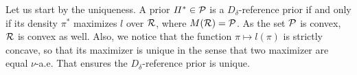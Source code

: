 Let us start by the uniqueness.
%
%
%
A prior $\varPi^\ast\in\mathcal{P}$ is a $D_\delta$-reference prior if and only if its density $\pi^\ast$ maximizes $l$ over $\mathcal{R}$, where $M(\mathcal{R})=\mathcal{P}$.
As the set $\mathcal{P}$ is convex, $\mathcal{R}$ is convex as well. Also, we notice that the function $\pi\mapsto l(\pi)$ is strictly concave, so that its maximizer is unique in the sense that two maximizer are equal $\nu$-a.e. That ensures the $D_\delta$-reference prior is unique.



